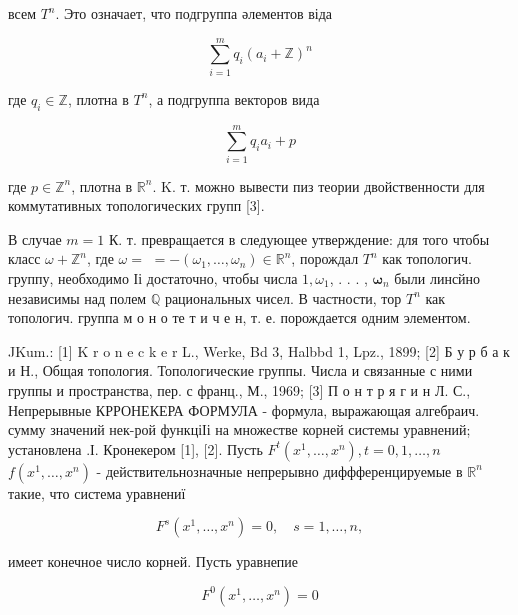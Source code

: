 \documentclass[10pt]{article}
\begin{document}
всем $T^{n}$. Это означает, что подгруппа әлементов віда



\[

\sum_{i=1}^{m} q_{i}\left(a_{i}+\mathbb{Z}\right)^{n}

\]



где $q_{i} \in \mathbb{Z}$, плотна в $T^{n}$, а подгруппа векторов вида



\[

\sum_{i=1}^{m} q_{i} a_{i}+p

\]



где $p \in \mathbb{Z}^{n}$, плотна в $\mathbb{R}^{n}$. K. т. можно вывести пиз теории двойственности для коммутативных топологических групп [3].



В случае $m=1$ К. т. превращается в следующее утверждение: для того чтобы класс $\omega+\mathbb{Z}^{n}$, где $\omega=$ $=-\left(\omega_{1}, \ldots, \omega_{n}\right) \in \mathbb{R}^{n}$, порождал $T^{n}$ как топологич. группу, необходимо Іі достаточно, чтобы числа $1, \omega_{1}$, . . . , $\boldsymbol{\omega}_{n}$ были линсйно независимы над полем $\mathbb{Q}$ рациональных чисел. В частности, тор $T^{n}$ как топологич. группа м о н о те т и ч е н, т. е. порождается одним элементом.



JKum.: [1] K r o n e c k e r L., Werke, Bd 3, Halbbd 1, Lpz., 1899; [2] Б у р б а к и Н., Общая топология. Топологические группы. Числа и связанные с ними группы и пространства, пер. с франц., М., 1969; [3] П о н т р я г и н Л. С., Непрерывные КРРОНЕКЕРА ФОРМУЛА - формула, выражающая алгебраич. сумму значений нек-рой функціІі на множестве корней системы уравнений; установлена .І. Кронекером [1], [2]. Пусть $F^{t}\left(x^{1}, \ldots, x^{n}\right), t=0,1, \ldots, n$ $f\left(x^{1}, \ldots, x^{n}\right)$ - действительнозначные непрерывно диффференцируемые в $\mathbb{R}^{n}$ такие, что система уравнениї



\[

F^{s}\left(x^{1}, \ldots, x^{n}\right)=0, \quad s=1, \ldots, n,

\]



имеет конечное число корней. Пусть уравнепие



\[

F^{0}\left(x^{1}, \ldots, x^{n}\right)=0

\]
\end{document}
